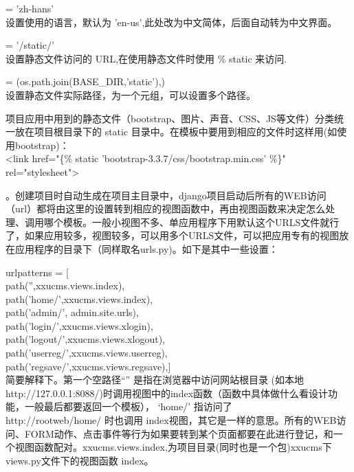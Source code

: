 \documentclass[a4paper]{ctexart}
\begin{document}
            {\color{blue}{LANGUAGE\_CODE}} = 'zh-hans'\\
            \indent 设置使用的语言，默认为 'en-us',此处改为中文简体，后面自动转为中文界面。
            
            {\color{blue}{STATIC\_URL}} = '/static/' \\
            \indent 设置静态文件访问的 URL,在使用静态文件时使用 {\% static }来访问.
            
                    {\color{blue}{STATICFILES\_DIRS}} = (os.path.join(BASE\_DIR,'static'),)\\
                    \indent 设置静态文件实际路径，为一个元组，可以设置多个路径。

                    项目应用中用到的静态文件（bootstrap、图片、声音、CSS、JS等文件）分类统一放在项目根目录下的  static 目录中。在模板中要用到相应的文件时这样用(如使用bootstrap)：\\
                    \indent <link href="\{\% static 'bootstrap-3.3.7/css/bootstrap.min.css' \%\}"\\ rel="stylesheet">

                    {\color{red}{二、urls.py}}。创建项目时自动生成在项目主目录中，django项目启动后所有的WEB访问（url）都将由这里的设置转到相应的视图函数中，再由视图函数来决定怎么处理、调用哪个模板。一般小视图不多、单应用程序下用默认这个URLS文件就行了，如果应用较多，视图较多，可以用多个URLS文件，可以把应用专有的视图放在应用程序的目录下（同样取名urls.py)。如下是其中一些设置：
                      
                      urlpatterns = [\\
                        path('',xxucms.views.index),\\
                        path('home/',xxucms.views.index),\\
                        path('admin/', admin.site.urls),\\
                        path('login/',xxucms.views.xlogin),\\
                        path('logout/',xxucms.views.xlogout),\\
                        path('userreg/',xxucms.views.userreg),\\                        
                        path('regsave/',xxucms.views.regsave),]\\

             简要解释下。第一个空路径“” 是指在浏览器中访问网站根目录
             (如本地http://127.0.0.1:8088/)时调用视图中的index函数（函数中具体做什么看设计功能，一般最后都要返回一个模板）， ‘home/' 指访问了\\http://rootweb/home/ 时也调用 index视图，其它是一样的意思。所有的WEB访问、FORM动作、点击事件等行为如果要转到某个页面都要在此进行登记，和一个视图函数配对。xxucms.views.index,为项目目录(同时也是一个包)xxucms下views.py文件下的视图函数 index。
\end{document}
